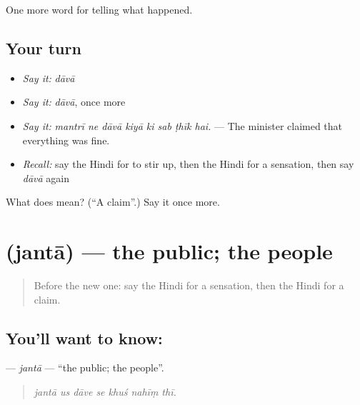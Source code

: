 \begin{grammarlens}[title={What you've built}]
One more word for telling what happened.
\end{grammarlens}

\subsection*{Your turn}
\begin{itemize}
\raggedright
  \item \emph{Say it:} \emph{dāvā}
  \item \emph{Say it:} \emph{dāvā}, once more
  \item \emph{Say it:} \emph{mantrī ne dāvā kiyā ki sab ṭhīk hai.} — The minister claimed that everything was fine.
  \item \emph{Recall:} say the Hindi for to stir up, then the Hindi for a sensation, then say \emph{dāvā} again
\end{itemize}

\begin{tcolorbox}[breakable,colback=teal!4,colframe=teal!35!black,title={Before you move on}]
What does  mean? (\textquotedblleft{}A claim\textquotedblright{}.) Say it once more.
\end{tcolorbox}
\section[\texorpdfstring{\hi{जनता} (jantā)}{जनता (jantā)}]{ (jantā) — the public; the people}

\label{lesson:HI-C315-janta}



\begin{quote}
Before the new one: say the Hindi for a sensation, then the Hindi for a claim.
\end{quote}

\subsection*{You'll want to know: }
\textbf{} — \emph{jantā} — \textquotedblleft{}the public; the people\textquotedblright{}.

\begin{quote}
      
\end{quote}

\begin{quote}
\emph{jantā us dāve se khuś nahīṃ thī.}
\end{quote}

